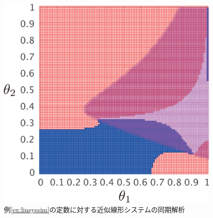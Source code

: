 \documentclass[tombow,dvipdfmx]{corona-a5}
\begin{document}
\begin{figure}[t]
{\begin{minipage}{0.32\linewidth}
    \centering
    \includegraphics[width = .85\linewidth]{figs/gam5thm}
  \end{minipage}
  \caption{例\ref{ex:linsyssim}の定数に対する近似線形システムの同期解析}
  \label{fig:gamthm}
  }
\end{figure}
\end{document}
